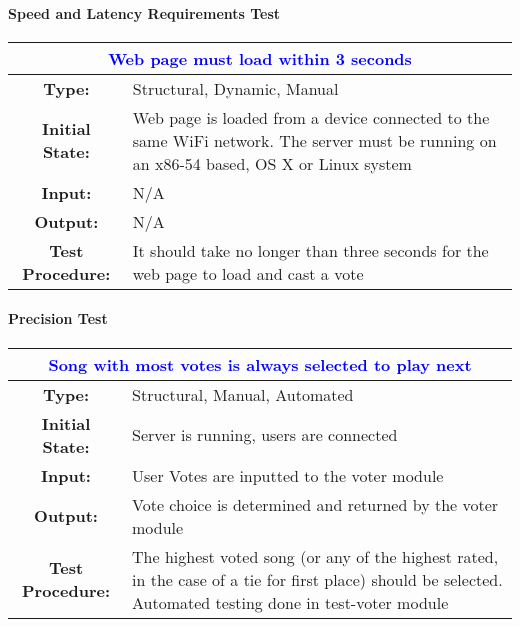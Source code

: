 \documentclass[12pt, titlepage]{article}
\begin{document}
\paragraph{Speed and Latency Requirements Test}

\begin{center}
\begin{table}[H]
\begin{tabularx}{\textwidth}{| c X |}
\hline
\multicolumn{2}{|c|}{\textbf{\textcolor{blue}{Web page must load within 3 seconds}}}\\
\hline
\textbf{Type: } & Structural, Dynamic, Manual\\
\textbf{Initial State: } & Web page is loaded from a device connected to the same WiFi network. The server must be running on an x86-54 based, OS X or Linux system\\
\textbf{Input: } & N/A\\
\textbf{Output: } & N/A \\
\textbf{Test Procedure:  } & It should take no longer than three seconds for the web page to load and cast a vote \\
\hline
\end{tabularx}
\end{table}
\end{center}

\paragraph{Precision Test}

\begin{center}
\begin{table}[H]
\begin{tabularx}{\textwidth}{| c X |}
\hline
\multicolumn{2}{|c|}{\textbf{\textcolor{blue}{Song with most votes is always selected to play next}}}\\
\hline
\textbf{Type: } & Structural, Manual, Automated\\
\textbf{Initial State: } & Server is running, users are connected\\
\textbf{Input: } & User Votes are inputted to the voter module\\
\textbf{Output: } & Vote choice is determined and returned by the voter module \\
\textbf{Test Procedure:  } & The highest voted song (or any of the highest rated, in the case of a tie for first place) should be selected. Automated testing done in test-voter module \\
\hline
\end{tabularx}
\end{table}
\end{center}
\end{document}
